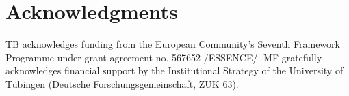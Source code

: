 \documentclass[10pt,a4paper]{article}
\begin{document}
\section{Acknowledgments}
TB   acknowledges   funding   from   the   European   Community's Seventh Framework Programme under grant agreement no.  567652 /ESSENCE/.  
MF gratefully acknowledges financial support by the Institutional Strategy of the University
of T\"{u}bingen (Deutsche Forschungsgemeinschaft, ZUK 63). 






\setlength{\bibleftmargin}{.125in}
\setlength{\bibindent}{-\bibleftmargin}


\end{document}
